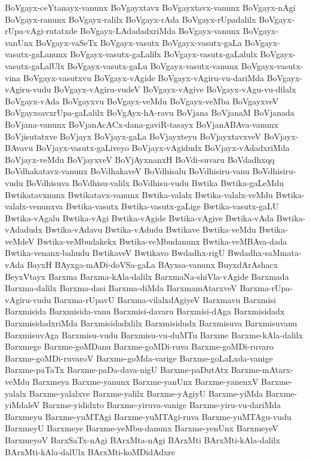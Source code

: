 {BoVgayx-ceYtanayx-vanunx
BoVgayxtavx
BoVgayxtavx-vanunx
BoVgayx-nAgi
BoVgayx-ranunx
BoVgayx-ralilx
BoVgayx-rAda
BoVgayx-rUpadalilx
BoVgayx-rUpa-vAgi-rutatxde
BoVgayx-LAdadadxriMda
BoVgayx-vanunx
BoVgayx-vanUnx
BoVgayx-vaSeTx
BoVgayx-vasutx
BoVgayx-vasutx-gaLa
BoVgayx-vasutx-gaLanunx
BoVgayx-vasutx-gaLalilx
BoVgayx-vasutx-gaLalulx
BoVgayx-vasutx-gaLalUlx
BoVgayx-vasutx-gaLu
BoVgayx-vasutx-vanunx
BoVgayx-vasutx-vina
BoVgayx-vasutxvu
BoVgayx-vAgide
BoVgayx-vAgiru-vu-dariMda
BoVgayx-vAgiru-vudu
BoVgayx-vAgiru-vudeV
BoVgayx-vAgive
BoVgayx-vAgu-vu-dilalx
BoVgayx-vAda
BoVgayxvu
BoVgayx-veMdu
BoVgayx-veMba
BoVgayxveV
BoVgayxsavxrUpa-gaLalilx
BoVgAyx-hA-ravu
BoVjana
BoVjanaM
BoVjanada
BoVjana-vanunx
BoVjanAcACx-dana-gaviR-tasayx
BoVjanABAva-vanunx
BoVjisutatxve
BoVjayx
BoVjayx-gaLa
BoVjayxteyu
BoVjayxtavxveV
BoVjayx-BAvavu
BoVjayx-vasutx-gaLiveyo
BoVjayx-vAgidudx
BoVjayx-vAdadxriMda
BoVjayx-veMdu
BoVjayxveV
BoVjAyxnanxH
BoVdi-suvaru
BoVdadhxqq
BoVdhakatavx-vanunx
BoVdhakaveV
BoVdhisalu
BoVdhisiru-vanu
BoVdhisiru-vudu
BoVdhisuva
BoVdhisu-valilx
BoVdhisu-vudu
Bwtika
Bwtika-gaLeMdu
Bwtikatavxnunx
Bwtikatavx-vanunx
Bwtika-valalx
Bwtika-valalx-veMdu
Bwtika-valalx-venunxva
Bwtika-vasutx
Bwtika-vasutx-gaLige
Bwtika-vasutx-gaLU
Bwtika-vAgalu
Bwtika-vAgi
Bwtika-vAgide
Bwtika-vAgive
Bwtika-vAda
Bwtika-vAdadudx
Bwtika-vAdavu
Bwtika-vAdudu
Bwtikave
Bwtika-veMdu
Bwtika-veMdeV
Bwtika-veMbudakekx
Bwtika-veMbudanunx
Bwtika-veMBAva-dada
Bwtika-venanx-bahudu
BwtikaveV
Bwtikavo
Bwdadhx-rigU
Bwdadhx-saMmata-vAda
BayxH
BAyxga-mADi-doVSa-gaLa
BAyxsa-vanunx
BuyxdArAshacx
BeyxVtayx
Barxma
Barxma-kAla-dalilx
BarxmaNa-shiVla-vAgide
Barxmada
Barxma-dalilx
Barxma-dasi
Barxma-diMda
BarxmamAtarxveV
Barxma-rUpa-vAgiru-vudu
Barxma-rUpavU
Barxma-vilalxdAgiyeV
Barxmavu
Barxmisi
Barxmisida
Barxmisida-vanu
Barxmisi-davaru
Barxmisi-dAga
Barxmisidadx
BarxmisidadxriMda
Barxmisidadxlilx
Barxmisidudx
Barxmisuva
Barxmisuvanu
BarxmisuvAga
Barxmisu-vudu
Barxmisu-vu-duMTu
Barxme
Barxme-kAla-dalilx
Barxmege
Barxme-goMDanu
Barxme-goMDi-ruva
Barxme-goMDi-ruvaro
Barxme-goMDi-ruvaroV
Barxme-goMda-varige
Barxme-goLaLxda-vanige
Barxme-paTaTx
Barxme-paDa-dava-nigU
Barxme-paDutAtx
Barxme-mAtarx-veMdu
Barxmeya
Barxme-yanunx
Barxme-yanUnx
Barxme-yanenxV
Barxme-yalalx
Barxme-yalalxve
Barxme-yalilx
Barxme-yAgiyU
Barxme-yiMda
Barxme-yiMdaleV
Barxme-yididxto
Barxme-yiruva-vanige
Barxme-yiru-vu-dariMda
Barxmeyu
Barxme-yuMTAgi
Barxme-yuMTAgi-ruva
Barxme-yuMTAgu-vudu
BarxmeyU
Barxmeye
Barxme-yeMbu-danunx
Barxme-yenUnx
BarxmeyeV
BarxmeyoV
BarxSaTx-nAgi
BArxMta-nAgi
BArxMti
BArxMti-kAla-dalilx
BArxMti-kAla-dalUlx
BArxMti-koMDidAdxre
}
